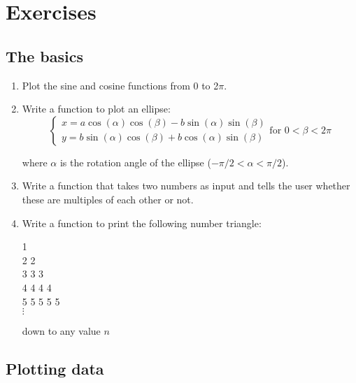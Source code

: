 \chapter{Exercises}
\label{ch:exercises}

\section{The basics}
\label{sec:ex-basics}

\begin{enumerate}
\item Plot the sine and cosine functions from 0 to 2$\pi$.
  
\item Write a function to plot an ellipse:
  \[
  \begin{cases}
    x = a\cos(\alpha)\cos(\beta) - b\sin(\alpha)\sin(\beta)\\
    y = b\sin(\alpha)\cos(\beta) + b\cos(\alpha)\sin(\beta)
  \end{cases}
  \mbox{for~} 0 < \beta < 2\pi
  \]

  \noindent where $\alpha$ is the rotation angle of the ellipse
  ($-\pi/2 < \alpha < \pi/2$).
  
\item Write a function that takes two numbers as input and tells the
  user whether these are multiples of each other or not.

\item Write a function to print the following number triangle:

  1\\
  2 2\\
  3 3 3\\
  4 4 4 4\\
  5 5 5 5 5\\
  $\vdots$
  
  down to any value $n$
  
\end{enumerate}

\section{Plotting data}
\label{sec:ex-plotting}

